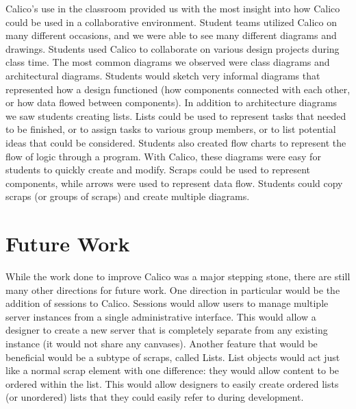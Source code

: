 Calico's use in the classroom provided us with the most insight into how Calico could be used in a collaborative environment. Student teams utilized Calico on many different occasions, and we were able to see many different diagrams and drawings. Students used Calico to collaborate on various design projects during class time. The most common diagrams we observed were class diagrams and architectural diagrams. Students would sketch very informal diagrams that represented how a design functioned (how components connected with each other, or how data flowed between components). In addition to architecture diagrams we saw students creating lists. Lists could be used to represent tasks that needed to be finished, or to assign tasks to various group members, or to list potential ideas that could be considered. Students also created flow charts to represent the flow of logic through a program. With Calico, these diagrams were easy for students to quickly create and modify. Scraps could be used to represent components, while arrows were used to represent data flow. Students could copy scraps (or groups of scraps) and create multiple diagrams.

%

\section*{Future Work}
While the work done to improve Calico was a major stepping stone, there are still many other directions for future work. One direction in particular would be the addition of sessions to Calico. Sessions would allow users to manage multiple server instances from a single administrative interface. This would allow a designer to create a new server that is completely separate from any existing instance (it would not share any canvases). Another feature that would be beneficial would be a subtype of scraps, called Lists. List objects would act just like a normal scrap element with one difference: they would allow content to be ordered within the list. This would allow designers to easily create ordered lists (or unordered) lists that they could easily refer to during development. 